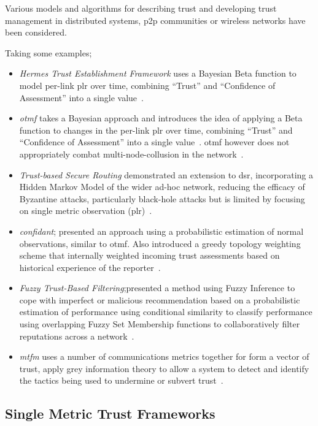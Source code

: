 \vspace{\baselineskip}

Various models and algorithms for describing trust and developing trust management in distributed systems, \gls{p2p} communities or wireless networks have been considered.

Taking some examples; %
%
\begin{itemize}
  \item \emph{Hermes Trust Establishment Framework} uses a Bayesian Beta function to model per-link \gls{plr} over time, combining ``Trust'' and ``Confidence of Assessment'' into a single value~\cite{Zouridaki2005}.
  \item \emph{\acrfull{otmf}} takes a Bayesian approach and introduces the idea of applying a Beta function to changes in the per-link \gls{plr} over time, combining ``Trust'' and ``Confidence of Assessment'' into a single value~\cite{Li2008}.
    \gls{otmf} however does not appropriately combat multi-node-collusion in the network~\cite{Cho2011}.
  \item \emph{Trust-based Secure Routing} demonstrated an extension to \gls{dsr}, incorporating a Hidden Markov Model of the wider ad-hoc network, reducing the efficacy of Byzantine attacks, particularly black-hole attacks but is limited by focusing on single metric observation (\gls{plr})~\cite{Moe2008a,Cho2011}.
  \item \emph{\gls{confidant}}; presented an approach using a probabilistic estimation of normal observations, similar to \gls{otmf}.
    Also introduced a greedy topology weighting scheme that internally weighted incoming trust assessments based on historical experience of the reporter~\cite{Buchegger2002}.
  \item \emph{Fuzzy Trust-Based Filtering};presented a method using Fuzzy Inference to cope with imperfect or malicious recommendation based on a probabilistic estimation of performance using conditional similarity to classify performance using overlapping Fuzzy Set Membership functions to collaboratively filter reputations across a network~\cite{Luo2008}.
  \item \emph{\acrfull{mtfm}} uses a number of communications metrics together for form a vector of trust, apply grey information theory to allow a system to detect and identify the tactics being used to undermine or subvert trust~\cite{Guo11}.
\end{itemize}
%

\subsection{Single Metric Trust Frameworks}\label{sec:single_trust}


